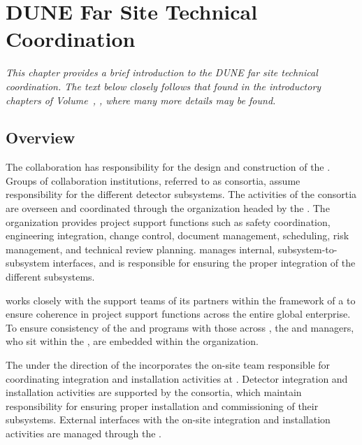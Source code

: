 \chapter{DUNE Far Site Technical Coordination}
\label{ch:exec-tc}

\textit{This chapter provides a brief introduction to the DUNE far site technical coordination.  The text below closely follows that found in the introductory chapters of Volume~\volnumbertc{}, \voltitletc{}, where many more details may be found.}

\section{Overview}   %


The  collaboration has  responsibility for the design 
and construction of the  .  Groups of collaboration 
institutions, referred to as consortia, assume responsibility for 
the different detector subsystems.  The activities of the consortia are 
overseen and coordinated through the   organization 
headed by the  .  The  organization 
provides project support functions such as safety coordination, 
engineering integration, change control, document management, scheduling, 
risk management, and technical review planning.    
manages internal, subsystem-to-subsystem interfaces, and is responsible 
for ensuring the proper integration of the different subsystems.   


  works closely with the support teams of its 
 partners within the framework of a  to 
ensure coherence in project support functions across the entire global 
enterprise.  To ensure consistency of the   
and  programs with those across , the 
  and  managers, who sit within 
the , are embedded within the   
organization.  

The   under the 
direction of the  incorporates the on-site team responsible 
for coordinating integration and installation activities at .
Detector integration and installation activities are supported by the
 consortia, which maintain responsibility for ensuring
proper installation and commissioning of their subsystems.  External
 interfaces with the on-site integration and installation
activities are managed through the . 


